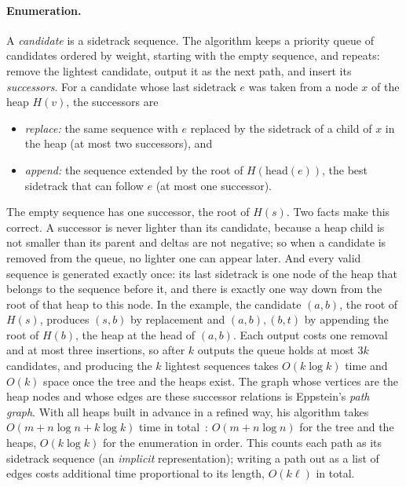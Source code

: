\documentclass[11pt,a4paper]{article}
\begin{document}
\paragraph{Enumeration.} A \emph{candidate} is a sidetrack sequence. The algorithm keeps a priority queue of
candidates ordered by weight, starting with the empty sequence, and repeats: remove the lightest candidate,
output it as the next path, and insert its \emph{successors}. For a candidate whose last sidetrack $e$ was taken from
a node $x$ of the heap $H(v)$, the successors are
\begin{itemize}
  \item \emph{replace:} the same sequence with $e$ replaced by the sidetrack of a child of $x$ in the heap (at most
        two successors), and
  \item \emph{append:} the sequence extended by the root of $H(\mathrm{head}(e))$, the best sidetrack that can
        follow $e$ (at most one successor).
\end{itemize}
The empty sequence has one successor, the root of $H(s)$. Two facts make this correct. A successor is never lighter
than its candidate, because a heap child is not smaller than its parent and deltas are not negative; so when a
candidate is removed from the queue, no lighter one can appear later. And every valid sequence is generated exactly
once: its last sidetrack is one node of the heap that belongs to the sequence before it, and there is exactly one
way down from the root of that heap to this node. In the example, the candidate $(a,b)$, the root of $H(s)$,
produces $(s,b)$ by replacement and $(a,b),(b,t)$ by appending the root of $H(b)$, the heap at the head of
$(a,b)$. Each output costs one removal and
at most three insertions, so after $k$ outputs the queue holds at most $3k$ candidates, and producing the $k$
lightest sequences takes $O(k\log k)$ time and $O(k)$ space once the tree and the heaps exist. The graph whose
vertices are the heap nodes and whose edges are these successor relations is Eppstein's \emph{path graph}. With all
heaps built in advance in a refined way, his algorithm takes $O(m+n\log n+k\log k)$ time in
total~\cite{eppstein1998}: $O(m+n\log n)$ for the tree and the heaps, $O(k\log k)$ for the enumeration in order.
This counts each path as its sidetrack sequence (an \emph{implicit} representation); writing a path out as a list
of edges costs additional time proportional to its length, $O(k\ell)$ in total.
\end{document}
